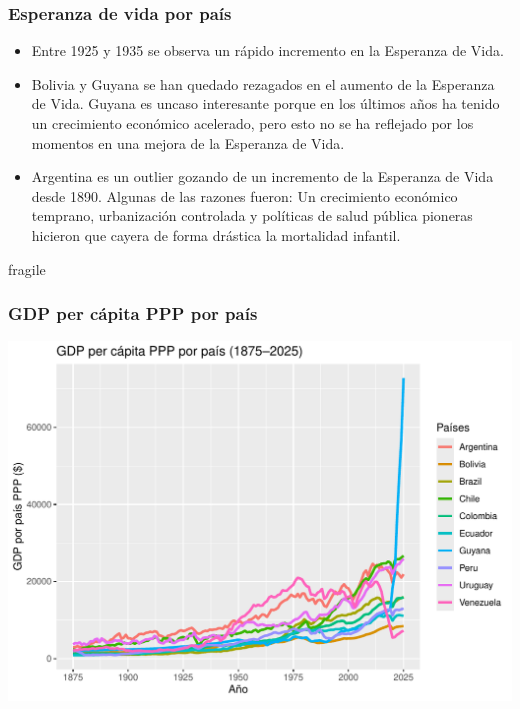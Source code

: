 \documentclass{beamer}
\begin{document}
\begin{frame}[fragile]
\frametitle{Esperanza de vida por país}

\begin{itemize}
\item<1> Entre 1925 y 1935 se observa un rápido incremento en la Esperanza de Vida.

\item<2> Bolivia y Guyana se han quedado rezagados en el aumento de la Esperanza de Vida. Guyana es uncaso interesante porque en los últimos años ha tenido un crecimiento económico acelerado, pero esto no se ha reflejado por los momentos en una mejora de la Esperanza de Vida.

\item<3> Argentina es un outlier gozando de un incremento de la Esperanza de Vida desde 1890. Algunas de las razones fueron: Un crecimiento económico temprano, urbanización controlada y políticas de salud pública pioneras hicieron que cayera de forma drástica la mortalidad infantil.

\end{itemize}
\end{frame}


\begin{frame}{fragile}
\frametitle{GDP per cápita PPP por país}

\includegraphics{presentacion_Parada_G_M8R2-004}

\end{frame}
\end{document}
